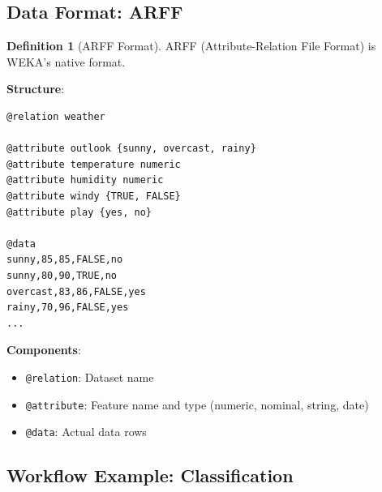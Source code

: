 \documentclass[11pt,twoside]{article}
\numberwithin{equation}{section}
\theoremstyle{plain}
\theoremstyle{definition}
\newtheorem{definition}[theorem]{Definition}
\theoremstyle{remark}
\begin{document}
\subsection{Data Format: ARFF}

\begin{definition}[ARFF Format]
ARFF (Attribute-Relation File Format) is WEKA's native format.

\textbf{Structure}:
\begin{lstlisting}
@relation weather

@attribute outlook {sunny, overcast, rainy}
@attribute temperature numeric
@attribute humidity numeric
@attribute windy {TRUE, FALSE}
@attribute play {yes, no}

@data
sunny,85,85,FALSE,no
sunny,80,90,TRUE,no
overcast,83,86,FALSE,yes
rainy,70,96,FALSE,yes
...
\end{lstlisting}

\textbf{Components}:
\begin{itemize}
\item \texttt{@relation}: Dataset name
\item \texttt{@attribute}: Feature name and type (numeric, nominal, string, date)
\item \texttt{@data}: Actual data rows
\end{itemize}
\end{definition}

\subsection{Workflow Example: Classification}
\end{document}
